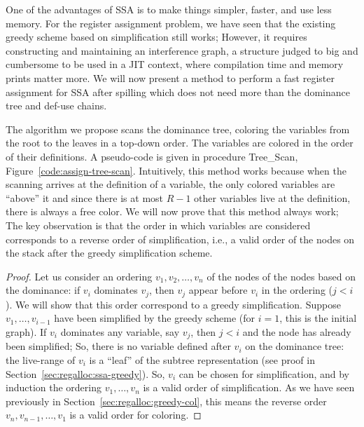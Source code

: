 {One of the advantages of SSA is to make things simpler, faster, and use less memory. 
For the register assignment problem, we have seen that the existing greedy scheme based on simplification still works; 
However, it requires constructing and maintaining an interference graph, a structure judged to big and cumbersome to be used in a JIT context, where compilation time and memory prints matter more. 
We will now present a method to perform a fast register assignment for SSA after spilling which does not need more than the dominance tree and def-use chains. 

The algorithm we propose scans the dominance tree, coloring the variables from the root to the leaves in a top-down order.
The variables are colored in the order of their definitions.
A pseudo-code is given in procedure Tree\_Scan, Figure~\ref{code:assign-tree-scan}.
Intuitively, this method works because when the scanning arrives at the definition of a variable, the only colored variables are ``above'' it and since there is at most $R-1$ other variables live at the definition, there is always a free color.
We will now prove that this method always work;
The key observation is that the order in which variables are considered corresponds to a reverse order of simplification, i.e., a valid order of the nodes on the stack after the greedy simplification scheme.

\begin{proof}
  \def\order{o}
  Let us consider an ordering $v_1, v_2, \ldots, v_n$ of the nodes of the nodes based on the dominance:
  if $v_i$ dominates $v_j$, then $v_j$ appear before $v_i$ in the ordering ($j < i$).
  We will show that this order correspond to a greedy simplification.
  Suppose $v_1, \ldots, v_{i-1}$ have been simplified by the greedy scheme (for $i=1$, this is the initial graph).
  If $v_i$ dominates any variable, say $v_j$, then $j < i$ and the node has already been simplified;
  So, there is no variable defined after $v_i$ on the dominance tree:
  the live-range of $v_i$ is a ``leaf'' of the subtree representation (see proof in Section~\ref{sec:regalloc:ssa-greedy}).
  So, $v_i$ can be chosen for simplification, and by induction the ordering $v_1, \ldots, v_n$ is a valid order of simplification. 
  As we have seen previously in Section~\ref{sec:regalloc:greedy-col}, this means the reverse order $v_n, v_{n-1}, \ldots, v_1$ is a valid order for coloring.
\end{proof}


}
